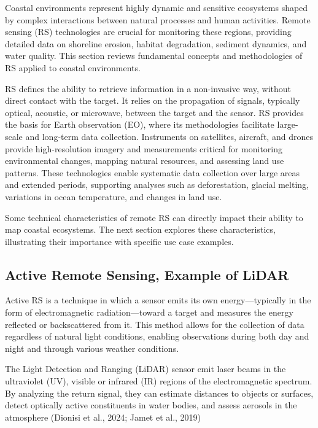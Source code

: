 \documentclass[
  letterpaper,
  11pt,
  english,
  singlespacing,
  headsepline]{MastersDoctoralThesis}
\begin{document}
\begin{spacing}{1.5}
Coastal environments represent highly dynamic and sensitive ecosystems
shaped by complex interactions between natural processes and human
activities. Remote sensing (RS) technologies are crucial for monitoring
these regions, providing detailed data on shoreline erosion, habitat
degradation, sediment dynamics, and water quality. This section reviews
fundamental concepts and methodologies of RS applied to coastal
environments.

RS defines the ability to retrieve information in a non-invasive way,
without direct contact with the target. It relies on the propagation of
signals, typically optical, acoustic, or microwave, between the target
and the sensor. RS provides the basis for Earth observation (EO), where
its methodologies facilitate large-scale and long-term data collection.
Instruments on satellites, aircraft, and drones provide high-resolution
imagery and measurements critical for monitoring environmental changes,
mapping natural resources, and assessing land use patterns. These
technologies enable systematic data collection over large areas and
extended periods, supporting analyses such as deforestation, glacial
melting, variations in ocean temperature, and changes in land use.

\begin{tcolorbox}
Some technical characteristics of remote RS can directly impact their ability to map coastal ecosystems. The next section explores these characteristics, illustrating their importance with specific use case examples.
\end{tcolorbox}

\subsection{Active Remote Sensing, Example of
LiDAR}\label{active-remote-sensing-example-of-lidar}

Active RS is a technique in which a sensor emits its own
energy---typically in the form of electromagnetic radiation---toward a
target and measures the energy reflected or backscattered from it. This
method allows for the collection of data regardless of natural light
conditions, enabling observations during both day and night and through
various weather conditions.

The Light Detection and Ranging (LiDAR) sensor emit laser beams in the
ultraviolet (UV), visible or infrared (IR) regions of the
electromagnetic spectrum. By analyzing the return signal, they can
estimate distances to objects or surfaces, detect optically active
constituents in water bodies, and assess aerosols in the atmosphere
(Dionisi et al., 2024; Jamet et al., 2019)


\end{spacing}
\end{document}
